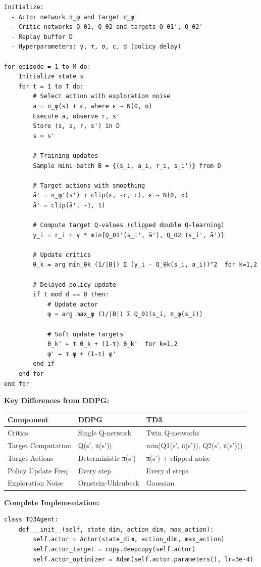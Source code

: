 \documentclass[12pt]{article}
\begin{document}
{{\begin{verbatim}
Initialize:
  - Actor network π_φ and target π_φ'
  - Critic networks Q_θ1, Q_θ2 and targets Q_θ1', Q_θ2'
  - Replay buffer D
  - Hyperparameters: γ, τ, σ, c, d (policy delay)

for episode = 1 to M do:
    Initialize state s
    for t = 1 to T do:
        # Select action with exploration noise
        a = π_φ(s) + ε, where ε ~ N(0, σ)
        Execute a, observe r, s'
        Store (s, a, r, s') in D
        s = s'

        # Training updates
        Sample mini-batch B = {(s_i, a_i, r_i, s_i')} from D

        # Target actions with smoothing
        ã' = π_φ'(s') + clip(ε, -c, c), ε ~ N(0, σ)
        ã' = clip(ã', -1, 1)

        # Compute target Q-values (clipped double Q-learning)
        y_i = r_i + γ * min{Q_θ1'(s_i', ã'), Q_θ2'(s_i', ã')}

        # Update critics
        θ_k = arg min_θk (1/|B|) Σ (y_i - Q_θk(s_i, a_i))^2  for k=1,2

        # Delayed policy update
        if t mod d == 0 then:
            # Update actor
            φ = arg max_φ (1/|B|) Σ Q_θ1(s_i, π_φ(s_i))

            # Soft update targets
            θ_k' ← τ θ_k + (1-τ) θ_k'  for k=1,2
            φ' ← τ φ + (1-τ) φ'
        end if
    end for
end for
\end{verbatim}

\textbf{Key Differences from DDPG:}

\begin{center}
\begin{tabular}{|l|l|l|}
\hline
\textbf{Component} & \textbf{DDPG} & \textbf{TD3} \\
\hline
Critics & Single Q-network & Twin Q-networks \\
Target Computation & Q(s', π(s')) & min(Q1(s', π(s')), Q2(s', π(s'))) \\
Target Actions & Deterministic π(s') & π(s') + clipped noise \\
Policy Update Freq & Every step & Every d steps \\
Exploration Noise & Ornstein-Uhlenbeck & Gaussian \\
\hline
\end{tabular}
\end{center}

\textbf{Complete Implementation:}

\begin{verbatim}
class TD3Agent:
    def __init__(self, state_dim, action_dim, max_action):
        self.actor = Actor(state_dim, action_dim, max_action)
        self.actor_target = copy.deepcopy(self.actor)
        self.actor_optimizer = Adam(self.actor.parameters(), lr=3e-4)


\end{verbatim}}}
\end{document}
